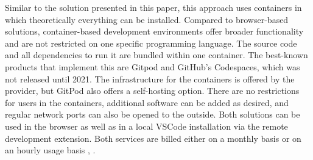 Similar to the solution presented in this paper, this approach uses containers in which theoretically everything can be installed. Compared to browser-based solutions, container-based development environments offer broader functionality and are not restricted on one specific programming language. The source code and all dependencies to run it are bundled within one container. The best-known products that implement this are Gitpod and GitHub's Codespaces, which was not released until 2021. The infrastructure for the containers is offered by the provider, but GitPod also offers a self-hosting option. There are no restrictions for users in the containers, additional software can be added as desired, and regular network ports can also be opened to the outside. Both solutions can be used in the browser as well as in a local \ac{VSCode} installation via the remote development extension.\newline
Both services are billed either on a monthly basis or on an hourly usage basis \cite{githubcodespace}, \cite{gitpod}.
